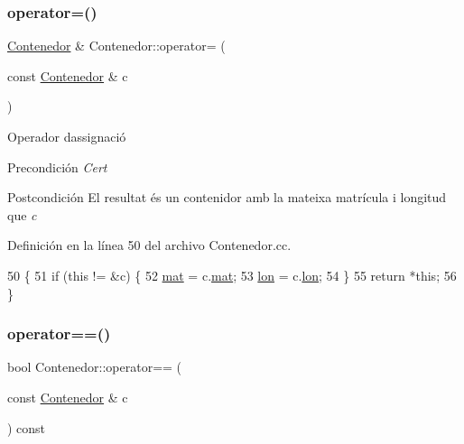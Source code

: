 \subsubsection{\texorpdfstring{operator=()}{operator=()}}
{\footnotesize\ttfamily \hyperlink{class_contenedor}{Contenedor} \& Contenedor\+::operator= (\begin{DoxyParamCaption}\item[{const \hyperlink{class_contenedor}{Contenedor} \&}]{c }\end{DoxyParamCaption})}



Operador d\textquotesingle{}assignació 

\begin{DoxyPrecond}{Precondición}
{\itshape Cert} 
\end{DoxyPrecond}
\begin{DoxyPostcond}{Postcondición}
El resultat és un contenidor amb la mateixa matrícula i longitud que {\itshape c} 
\end{DoxyPostcond}


Definición en la línea 50 del archivo Contenedor.\+cc.


\begin{DoxyCode}
50                                                      \{
51   \textcolor{keywordflow}{if} (\textcolor{keyword}{this} != &c) \{
52     \hyperlink{class_contenedor_a219718cff2c0f94314defbf8d747bfa9}{mat} = c.\hyperlink{class_contenedor_a219718cff2c0f94314defbf8d747bfa9}{mat};
53     \hyperlink{class_contenedor_a364e04e5a1c7787463981f192f48e4ce}{lon} = c.\hyperlink{class_contenedor_a364e04e5a1c7787463981f192f48e4ce}{lon};
54   \}
55   \textcolor{keywordflow}{return} *\textcolor{keyword}{this};
56 \}
\end{DoxyCode}
\mbox{\label{class_contenedor_affecade7507a978e3abb5eea331a509e}} 
\subsubsection{\texorpdfstring{operator==()}{operator==()}}
{\footnotesize\ttfamily bool Contenedor\+::operator== (\begin{DoxyParamCaption}\item[{const \hyperlink{class_contenedor}{Contenedor} \&}]{c }\end{DoxyParamCaption}) const}



